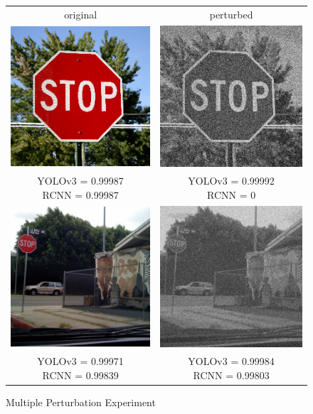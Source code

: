 \documentclass{article}
\begin{document}
\begin{figure}[h]
\centering
\begin{tabular}{ c c }
    original & perturbed \\
    \includegraphics[width=0.3\linewidth]{../test_images/stop.png} & \includegraphics[width=0.3\linewidth]{../test_images/perturbed/stop_contrast_0_025_noise_200_grayscale_0_010.png} \\
    \makecell{YOLOv3 = 0.99987 \\ RCNN = 0.99987} & \makecell{YOLOv3 = 0.99992 \\ RCNN = 0} \\[1cm]
    \includegraphics[width=0.3\linewidth]{../test_images/stop3.png} & \includegraphics[width=0.3\linewidth]{../test_images/perturbed/stop3_contrast_0_025_noise_200_grayscale_0_010.png} \\
    \makecell{YOLOv3 = 0.99971 \\ RCNN = 0.99839} & \makecell{YOLOv3 = 0.99984 \\ RCNN = 0.99803} \\
\end{tabular}
\caption{Multiple Perturbation Experiment}
\label{fig:multiperturb}
\end{figure}
\end{document}
